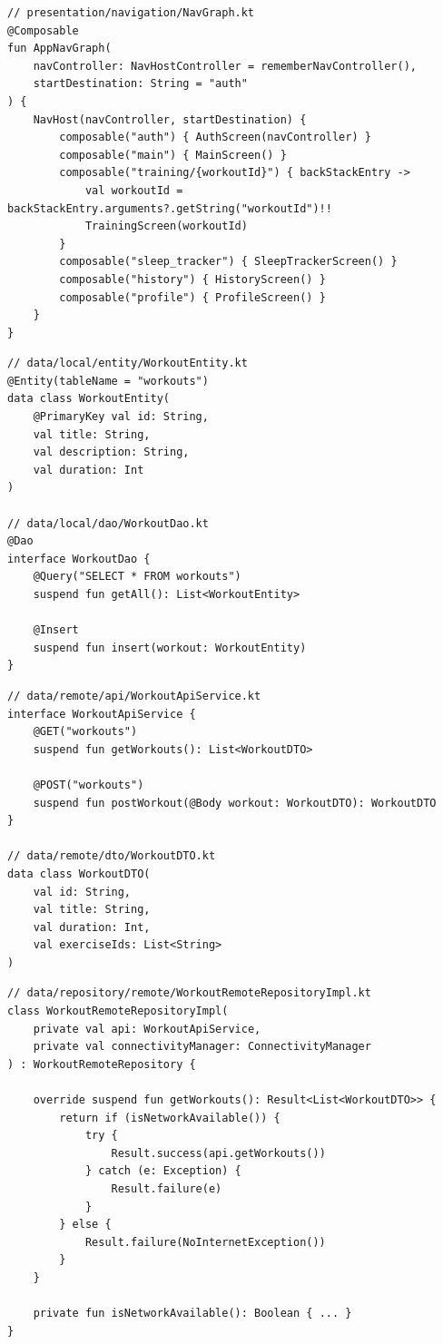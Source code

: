 \begin{lstlisting}[caption={Навигация (Jetpack Navigation)}]
// presentation/navigation/NavGraph.kt
@Composable
fun AppNavGraph(
    navController: NavHostController = rememberNavController(),
    startDestination: String = "auth"
) {
    NavHost(navController, startDestination) {
        composable("auth") { AuthScreen(navController) }
        composable("main") { MainScreen() }
        composable("training/{workoutId}") { backStackEntry ->
            val workoutId = backStackEntry.arguments?.getString("workoutId")!!
            TrainingScreen(workoutId)
        }
        composable("sleep_tracker") { SleepTrackerScreen() }
        composable("history") { HistoryScreen() }
        composable("profile") { ProfileScreen() }
    }
}
\end{lstlisting}

\begin{lstlisting}[caption={Room Entity и DAO (data)}]
// data/local/entity/WorkoutEntity.kt
@Entity(tableName = "workouts")
data class WorkoutEntity(
    @PrimaryKey val id: String,
    val title: String,
    val description: String,
    val duration: Int
)

// data/local/dao/WorkoutDao.kt
@Dao
interface WorkoutDao {
    @Query("SELECT * FROM workouts")
    suspend fun getAll(): List<WorkoutEntity>

    @Insert
    suspend fun insert(workout: WorkoutEntity)
}
\end{lstlisting}

\begin{lstlisting}[caption={Retrofit сервис и DTO (data/remote)}]
// data/remote/api/WorkoutApiService.kt
interface WorkoutApiService {
    @GET("workouts")
    suspend fun getWorkouts(): List<WorkoutDTO>

    @POST("workouts")
    suspend fun postWorkout(@Body workout: WorkoutDTO): WorkoutDTO
}

// data/remote/dto/WorkoutDTO.kt
data class WorkoutDTO(
    val id: String,
    val title: String,
    val duration: Int,
    val exerciseIds: List<String>
)
\end{lstlisting}

\begin{lstlisting}[caption={Реализация удалённого репозитория (data)}]
// data/repository/remote/WorkoutRemoteRepositoryImpl.kt
class WorkoutRemoteRepositoryImpl(
    private val api: WorkoutApiService,
    private val connectivityManager: ConnectivityManager
) : WorkoutRemoteRepository {

    override suspend fun getWorkouts(): Result<List<WorkoutDTO>> {
        return if (isNetworkAvailable()) {
            try {
                Result.success(api.getWorkouts())
            } catch (e: Exception) {
                Result.failure(e)
            }
        } else {
            Result.failure(NoInternetException())
        }
    }

    private fun isNetworkAvailable(): Boolean { ... }
}
\end{lstlisting}

